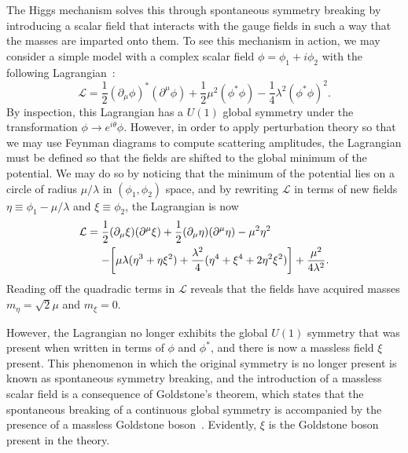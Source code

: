 The Higgs mechanism solves this through spontaneous symmetry breaking by introducing a scalar field that interacts with the gauge fields in such a way that the masses are imparted onto them.
To see this mechanism in action, we may consider a simple model with a complex scalar field $\phi=\phi_1+i\phi_2$ with the following Lagrangian~\cite{GriffithsParticle}:
\begin{equation}
  \mathcal{L}=\frac{1}{2}(\partial_\mu\phi)^*(\partial^\mu\phi)+\frac{1}{2}\mu^2(\phi^*\phi)-\frac{1}{4}\lambda^2(\phi^*\phi)^2.
\end{equation}
By inspection, this Lagrangian has a $U(1)$ global symmetry under the transformation $\phi\to e^{i\theta}\phi$.
However, in order to apply perturbation theory so that we may use Feynman diagrams to compute scattering amplitudes, the Lagrangian must be defined so that the fields are shifted to the global minimum of the potential. %
We may do so by noticing that the minimum of the potential lies on a circle of radius $\mu/\lambda$ in $(\phi_1,\phi_2)$ space, and by rewriting $\mathcal{L}$ in terms of new fields $\eta\equiv\phi_1-\mu/\lambda$ and $\xi\equiv\phi_2$, the Lagrangian is now
\begin{equation}
  \begin{aligned}
    \mathcal{L} &= \frac{1}{2}(\partial_\mu\xi)(\partial^\mu\xi)+\frac{1}{2}(\partial_\mu\eta)(\partial^\mu\eta)-\mu^2\eta^2\\
    &\equad- \bqty{\mu\lambda(\eta^3+\eta\xi^2)+\frac{\lambda^2}{4}(\eta^4+\xi^4+2\eta^2\xi^2)}+\frac{\mu^2}{4\lambda^2}.
  \end{aligned}
\end{equation}
Reading off the quadradic terms in $\mathcal{L}$ reveals that the fields have acquired masses $m_\eta=\sqrt{2}\mu$ and $m_\xi=0$.

However, the Lagrangian no longer exhibits the global $U(1)$ symmetry that was present when written in terms of $\phi$ and $\phi^*$, and there is now a massless field $\xi$ present.
This phenomenon in which the original symmetry is no longer present is known as spontaneous symmetry breaking, and the introduction of a massless scalar field is a consequence of Goldstone's theorem, which states that the spontaneous breaking of a continuous global symmetry is accompanied by the presence of a massless Goldstone boson~\cite{PhysRev.127.965}.
Evidently, $\xi$ is the Goldstone boson present in the theory.

